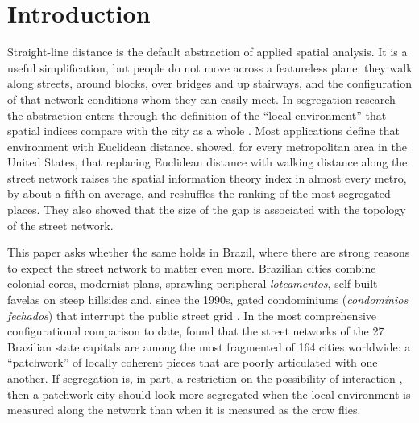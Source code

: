 \section{Introduction}\label{sec:intro}

Straight-line distance is the default abstraction of applied spatial analysis. It is a useful simplification,
but people do not move across a featureless plane: they walk along streets, around blocks, over bridges and up
stairways, and the configuration of that network conditions whom they can easily meet. In segregation research
the abstraction enters through the definition of the ``local environment'' that spatial indices compare with the
city as a whole \citep{reardon2004measures}. Most applications define that environment with Euclidean distance.
\citet{knaap2024segregated} showed, for every metropolitan area in the United States, that replacing Euclidean
distance with walking distance along the street network raises the spatial information theory index in almost
every metro, by about a fifth on average, and reshuffles the ranking of the most segregated places. They also
showed that the size of the gap is associated with the topology of the street network.

This paper asks whether the same holds in Brazil, where there are strong reasons to expect the street network to
matter even more. Brazilian cities combine colonial cores, modernist plans, sprawling peripheral \emph{loteamentos},
self-built favelas on steep hillsides and, since the 1990s, gated condominiums (\emph{condom\'inios fechados}) that
interrupt the public street grid \citep{coy2006gated}. In the most comprehensive configurational comparison to
date, \citet{medeiros2013urbis} found that the street networks of the 27 Brazilian state capitals are among the
most fragmented of 164 cities worldwide: a ``patchwork'' of locally coherent pieces that are poorly articulated
with one another. If segregation is, in part, a restriction on the possibility of interaction
\citep{netto2015segregated}, then a patchwork city should look more segregated when the local environment is
measured along the network than when it is measured as the crow flies.

